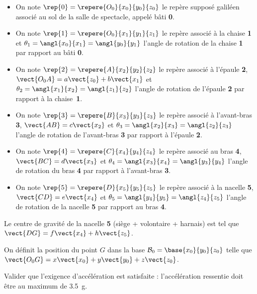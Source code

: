 \begin{itemize}
\item On note $\rep{0}=\repere{O_0}{x_0}{y_0}{z_0}$ le repère supposé galiléen associé au sol de la salle de spectacle, appelé bâti \textbf{0}.
\item On note $\rep{1}=\repere{O_0}{x_1}{y_1}{z_1}$ le repère associé à la chaise \textbf{1} et $\theta_1=\angl{x_0}{x_1}=\angl{y_0}{y_1}$ l'angle de rotation de la chaise \textbf{1} par rapport au bâti \textbf{0}.
\item On note $\rep{2}=\repere{A}{x_2}{y_2}{z_2}$ le repère associé à l'épaule \textbf{2}, $\vect{O_0A} = a\vect{z_0} + b\vect{x_1}$ et $\theta_2=\angl{x_1}{x_2}=\angl{z_1}{z_2}$ l'angle de rotation de l'épaule \textbf{2} par rapport à la chaise~\textbf{1}.
\item On note $\rep{3}=\repere{B}{x_3}{y_3}{z_3}$ le repère associé à l'avant-bras \textbf{3}, $\vect{AB} = c\vect{x_2}$ et $\theta_3=\angl{x_2}{x_3}=\angl{z_2}{z_3}$ l'angle de rotation de l'avant-bras \textbf{3} par rapport à l'épaule \textbf{2}.
\item On note $\rep{4}=\repere{C}{x_4}{y_4}{z_4}$ le repère associé au bras \textbf{4}, $\vect{BC} = d\vect{x_3}$ et $\theta_4=\angl{x_3}{x_4}=\angl{y_3}{y_4}$ l'angle de rotation du bras \textbf{4} par rapport à l'avant-bras \textbf{3}.
\item On note $\rep{5}=\repere{D}{x_5}{y_5}{z_5}$ le repère associé à la nacelle \textbf{5}, $\vect{CD} = e\vect{x_4}$ et $\theta_5=\angl{y_4}{y_5}=\angl{z_4}{z_5}$ l'angle de rotation de la nacelle \textbf{5} par rapport au bras \textbf{4}.
\end{itemize}
Le centre de gravité de la nacelle \textbf{5} (siège + volontaire + harnais) est tel que $\vect{DG}=f\vect{x_4}+h\vect{z_5}$. 

On définit la position du point $G$ dans la base $\mathcal{B}_0 = \base{x_0}{y_0}{z_0}$ telle que $\vect{O_0 G} = x\vect{x_0}+y\vect{y_0}+z\vect{z_0}$.
 
\ifprof
\begin{corrige}
\end{corrige}
\else\fi


\ifprof
\begin{corrige}
\end{corrige}
\else\fi

\begin{obj}
Valider que l'exigence d'accélération est satisfaite : l'accélération ressentie doit être au maximum de \SI{3,5}{g}.
\end{obj}


